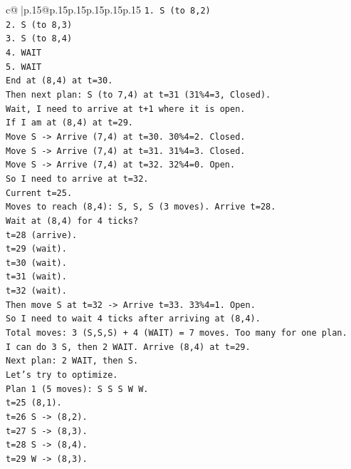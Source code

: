 \documentclass{article}
\begin{document}
{\begin{supertabular}{c@{$\;$}|p{.15\linewidth}@{}p{.15\linewidth}p{.15\linewidth}p{.15\linewidth}p{.15\linewidth}p{.15\linewidth}}
{{{\texttt{1. S (to 8,2)} \\
\texttt{2. S (to 8,3)} \\
\texttt{3. S (to 8,4)} \\
\texttt{4. WAIT} \\
\texttt{5. WAIT} \\
\texttt{End at (8,4) at t=30.} \\
\texttt{Then next plan: S (to 7,4) at t=31 (31\%4=3, Closed).} \\
\texttt{Wait, I need to arrive at t+1 where it is open.} \\
\texttt{If I am at (8,4) at t=29.} \\
\texttt{Move S {-}> Arrive (7,4) at t=30. 30\%4=2. Closed.} \\
\texttt{Move S {-}> Arrive (7,4) at t=31. 31\%4=3. Closed.} \\
\texttt{Move S {-}> Arrive (7,4) at t=32. 32\%4=0. Open.} \\
\texttt{So I need to arrive at t=32.} \\
\texttt{Current t=25.} \\
\texttt{Moves to reach (8,4): S, S, S (3 moves). Arrive t=28.} \\
\texttt{Wait at (8,4) for 4 ticks?} \\
\texttt{t=28 (arrive).} \\
\texttt{t=29 (wait).} \\
\texttt{t=30 (wait).} \\
\texttt{t=31 (wait).} \\
\texttt{t=32 (wait).} \\
\texttt{Then move S at t=32 {-}> Arrive t=33. 33\%4=1. Open.} \\
\texttt{So I need to wait 4 ticks after arriving at (8,4).} \\
\texttt{Total moves: 3 (S,S,S) + 4 (WAIT) = 7 moves. Too many for one plan.} \\
\texttt{I can do 3 S, then 2 WAIT. Arrive (8,4) at t=29.} \\
\texttt{Next plan: 2 WAIT, then S.} \\
\texttt{Let's try to optimize.} \\
\texttt{Plan 1 (5 moves): S S S W W.} \\
\texttt{t=25 (8,1).} \\
\texttt{t=26 S {-}> (8,2).} \\
\texttt{t=27 S {-}> (8,3).} \\
\texttt{t=28 S {-}> (8,4).} \\
\texttt{t=29 W {-}> (8,3).} \\
}}}
\end{supertabular}}
\end{document}
